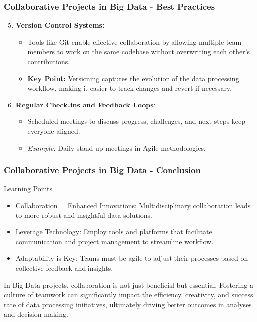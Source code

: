 \documentclass[aspectratio=169]{beamer}
\begin{document}
\begin{frame}[fragile]
    \frametitle{Collaborative Projects in Big Data - Best Practices}
    \begin{enumerate}
        \setcounter{enumi}{4} %
        \item \textbf{Version Control Systems:}
        \begin{itemize}
            \item Tools like Git enable effective collaboration by allowing multiple team members to work on the same codebase without overwriting each other's contributions.
            \item \textbf{Key Point:} Versioning captures the evolution of the data processing workflow, making it easier to track changes and revert if necessary.
        \end{itemize}

        \item \textbf{Regular Check-ins and Feedback Loops:}
        \begin{itemize}
            \item Scheduled meetings to discuss progress, challenges, and next steps keep everyone aligned.
            \item \textit{Example:} Daily stand-up meetings in Agile methodologies.
        \end{itemize}
    \end{enumerate}
\end{frame}

\begin{frame}[fragile]
    \frametitle{Collaborative Projects in Big Data - Conclusion}
    \begin{block}{Learning Points}
        \begin{itemize}
            \item Collaboration = Enhanced Innovations: Multidisciplinary collaboration leads to more robust and insightful data solutions.
            \item Leverage Technology: Employ tools and platforms that facilitate communication and project management to streamline workflow.
            \item Adaptability is Key: Teams must be agile to adjust their processes based on collective feedback and insights.
        \end{itemize}
    \end{block}

    In Big Data projects, collaboration is not just beneficial but essential. Fostering a culture of teamwork can significantly impact the efficiency, creativity, and success rate of data processing initiatives, ultimately driving better outcomes in analyses and decision-making.
\end{frame}
\end{document}
